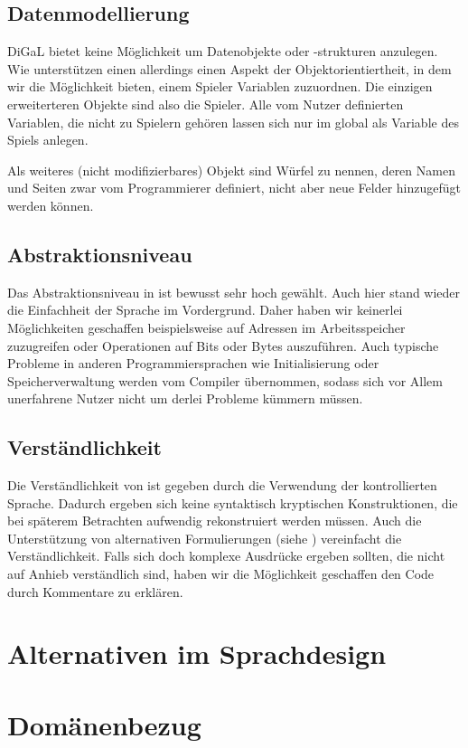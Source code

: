 \subsection{Datenmodellierung} %
\label{sub:datenmodellierung}
DiGaL bietet keine Möglichkeit um Datenobjekte oder -strukturen anzulegen. Wie unterstützen einen allerdings einen Aspekt der Objektorientiertheit, in dem wir die Möglichkeit bieten, einem Spieler Variablen zuzuordnen. Die einzigen erweiterteren Objekte sind also die Spieler. Alle vom Nutzer definierten Variablen, die nicht zu Spielern gehören lassen sich nur im global als Variable des Spiels anlegen.

Als weiteres (nicht modifizierbares) Objekt sind Würfel zu nennen, deren Namen und Seiten zwar vom Programmierer definiert, nicht aber neue Felder hinzugefügt werden können.

\subsection{Abstraktionsniveau} %
\label{sub:abstraktionsniveau}
	Das Abstraktionsniveau in \dg ist bewusst sehr hoch gewählt. Auch hier stand wieder die Einfachheit der Sprache im Vordergrund. Daher haben wir keinerlei Möglichkeiten geschaffen beispielsweise auf Adressen im Arbeitsspeicher zuzugreifen oder Operationen auf Bits oder Bytes auszuführen. Auch typische Probleme in anderen Programmiersprachen wie Initialisierung oder Speicherverwaltung werden vom Compiler übernommen, sodass sich vor Allem unerfahrene Nutzer nicht um derlei Probleme kümmern müssen. 

\subsection{Verständlichkeit} %
\label{sub:verstandlichkeit}
	Die Verständlichkeit von \dg ist gegeben durch die Verwendung der kontrollierten Sprache. Dadurch ergeben sich keine syntaktisch kryptischen Konstruktionen, die bei späterem Betrachten aufwendig rekonstruiert werden müssen. Auch die Unterstützung von alternativen Formulierungen (siehe ) vereinfacht die Verständlichkeit. Falls sich doch komplexe Ausdrücke ergeben sollten, die nicht auf Anhieb verständlich sind, haben wir die Möglichkeit geschaffen den Code durch Kommentare zu erklären.



\section{Alternativen im Sprachdesign} %
\label{sec:alternativen_im_sprachdesign}


\section{Domänenbezug} %
\label{sec:domanenbezug}

